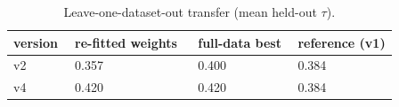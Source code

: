 \begin{table}[htbp]
\centering\scriptsize
\caption{Leave-one-dataset-out transfer (mean held-out $\tau$).}
\label{tab:cmp_transfer}
\setlength{\tabcolsep}{3pt}
\begin{tabular}{lp{0.326\linewidth}p{0.269\linewidth}p{0.269\linewidth}}
\toprule
version & re-fitted weights & full-data best & reference (v1) \\
\midrule
v2 & 0.357 & 0.400 & 0.384 \\
v4 & 0.420 & 0.420 & 0.384 \\
\bottomrule
\end{tabular}
\end{table}
